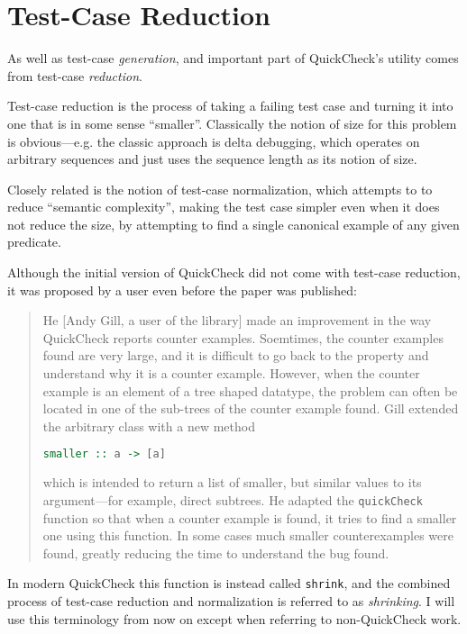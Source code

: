 \section{Test-Case Reduction}\label{sec:shrinking}

As well as test-case \emph{generation},
and important part of QuickCheck's utility comes from test-case \emph{reduction}.

Test-case reduction is the process of taking a failing test case and turning it into one that is in some sense ``smaller''.
Classically the notion of size for this problem is obvious---e.g.
the classic approach is delta debugging\cite{DBLP:journals/tse/ZellerH02},
which operates on arbitrary sequences and just uses the sequence length as its notion of size.

Closely related is the notion of test-case normalization\cite{DBLP:conf/issta/GroceHK17},
which attempts to to reduce ``semantic complexity'',
making the test case simpler even when it does not reduce the size,
by attempting to find a single canonical example of any given predicate.

Although the initial version of QuickCheck did not come with test-case reduction,
it was proposed by a user even before the paper was published:

\begin{quote}
He [Andy Gill, a user of the library] made an improvement in the way QuickCheck reports counter examples.
Soemtimes, the counter examples found are very large,
and it is difficult to go back to the property and understand why it is a counter example.
However,
when the counter example is an element of a tree shaped datatype,
the problem can often be located in one of the sub-trees of the counter example found.
Gill extended the arbitrary class with a new method

\begin{lstlisting}[language=Haskell]
smaller :: a -> [a]
\end{lstlisting}

which is intended to return a list of smaller, but similar values to its argument---for example, direct subtrees.
He adapted the \texttt{quickCheck} function so that when a counter example is found,
it tries to find a smaller one using this function.
In some cases much smaller counterexamples were found,
greatly reducing the time to understand the bug found.
\end{quote}

In modern QuickCheck this function is instead called \texttt{shrink},
and the combined process of test-case reduction and normalization is referred to as \emph{shrinking}.
I will use this terminology from now on except when referring to non-QuickCheck work.

